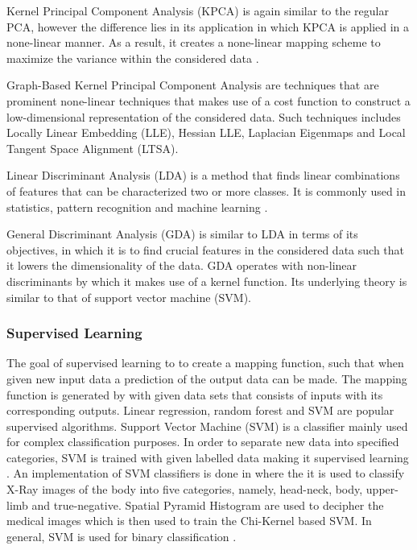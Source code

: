 \documentclass[11pt,twocolumn]{witseiepaper}
\begin{document}
	Kernel Principal Component Analysis (KPCA) is again similar to the regular PCA, however the difference lies in its application in which KPCA is applied in a none-linear manner. As a result, it creates a none-linear mapping scheme to maximize the variance within the considered data \cite{KPCA_2016}.
	
	Graph-Based Kernel Principal Component Analysis are techniques that are prominent none-linear techniques that makes use of a cost function to construct a low-dimensional representation of the considered data. Such techniques includes Locally Linear Embedding (LLE), Hessian LLE, Laplacian Eigenmaps and Local Tangent Space Alignment (LTSA). 
	
	Linear Discriminant Analysis (LDA)  is a method that finds linear combinations of features that can be characterized two or more classes. It is commonly used in statistics, pattern recognition and machine learning \cite{LDA_2016}.
	
	General Discriminant Analysis (GDA) is similar to LDA in terms of its objectives, in which it is to find crucial features in the considered data such that it lowers the dimensionality of the data. GDA operates with non-linear discriminants by which it makes use of a kernel function. Its underlying theory is similar to that of support vector machine (SVM).
	
	\subsubsection{\textbf{Supervised Learning}}
	The goal of supervised learning to to create a mapping function, such that when given new input data a prediction of the output data can be made. The mapping function is generated by with given data sets that consists of inputs with its corresponding outputs. Linear regression, random forest and SVM are popular supervised algorithms.
	Support Vector Machine (SVM) is a classifier mainly used for complex classification purposes. In order to separate new data into specified categories, SVM is trained with given labelled data making it supervised learning \cite{Rebentrost2014}. An implementation of SVM classifiers is done in \cite{saha_classifying_2016} where the it is used to classify X-Ray images of the body into five categories, namely, head-neck, body, upper-limb and true-negative. Spatial Pyramid Histogram are used to decipher the medical images which is then used to train the Chi-Kernel based SVM. In general, SVM is used for binary classification \cite{Rebentrost2014}.
	
\end{document}
